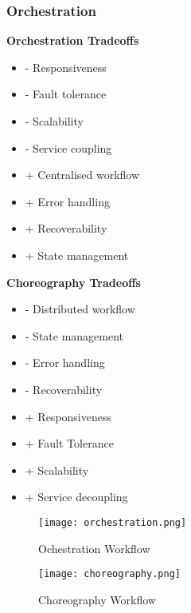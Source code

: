 \subsubsection{Orchestration}

\begin{minipage}[t]{0.5\textwidth}
	\textbf{Orchestration Tradeoffs}
	\begin{itemize}
		\item - Responsiveness
		\item - Fault tolerance
		\item - Scalability
		\item - Service coupling
		\item + Centralised workflow
		\item + Error handling
		\item + Recoverability
		\item + State management
	\end{itemize}
\end{minipage}
\begin{minipage}[t]{0.5\textwidth}
	\textbf{Choreography Tradeoffs}
	\begin{itemize}
		\item - Distributed workflow
		\item - State management
		\item - Error handling
		\item - Recoverability
		\item + Responsiveness
		\item + Fault Tolerance
		\item + Scalability
		\item + Service decoupling
	\end{itemize}
\end{minipage}

\begin{figure}[H]
  \center
  \texttt{[image: orchestration.png]}
  \caption{Ochestration Workflow}
\end{figure}


\begin{figure}[H]
  \center
  \texttt{[image: choreography.png]}
  \caption{Choreography Workflow}
\end{figure}

